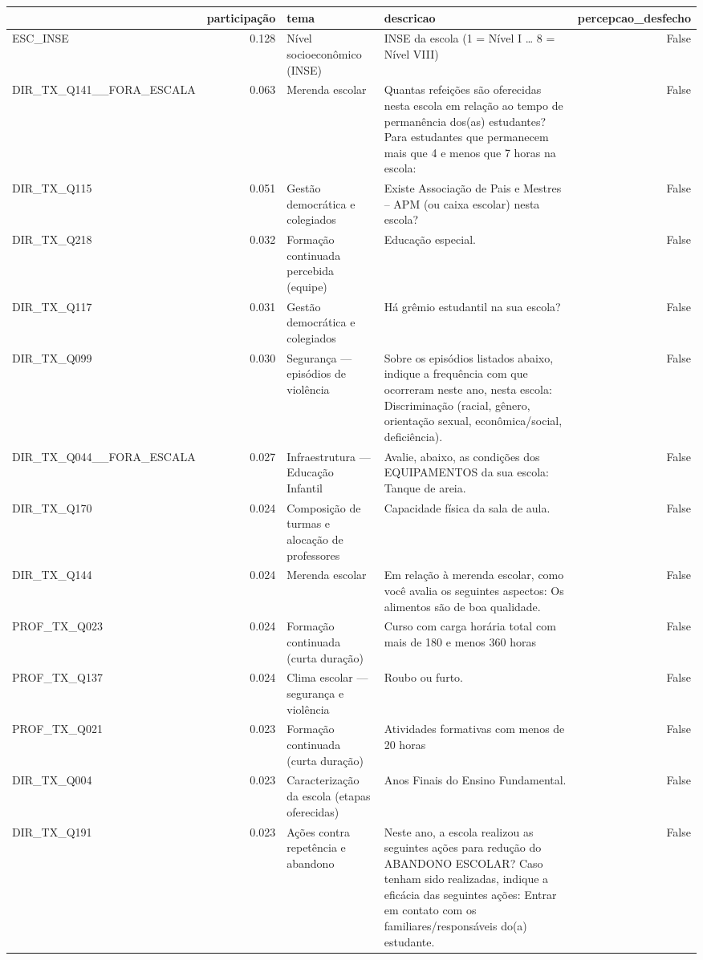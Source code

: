 \begin{tabular}{lrllr}
\toprule
 & participação & tema & descricao & percepcao\_desfecho \\
\midrule
ESC\_INSE & 0.128 & Nível socioeconômico (INSE) & INSE da escola (1 = Nível I … 8 = Nível VIII) & False \\
DIR\_TX\_Q141\_\_FORA\_ESCALA & 0.063 & Merenda escolar & Quantas refeições são oferecidas nesta escola em relação ao tempo de permanência dos(as) estudantes? Para estudantes que permanecem mais que 4 e menos que 7 horas na escola: & False \\
DIR\_TX\_Q115 & 0.051 & Gestão democrática e colegiados & Existe Associação de Pais e Mestres – APM (ou caixa escolar) nesta escola? & False \\
DIR\_TX\_Q218 & 0.032 & Formação continuada percebida (equipe) & Educação especial. & False \\
DIR\_TX\_Q117 & 0.031 & Gestão democrática e colegiados & Há grêmio estudantil na sua escola? & False \\
DIR\_TX\_Q099 & 0.030 & Segurança — episódios de violência & Sobre os episódios listados abaixo, indique a frequência com que ocorreram neste ano, nesta escola: Discriminação (racial, gênero, orientação sexual, econômica/social, deficiência). & False \\
DIR\_TX\_Q044\_\_FORA\_ESCALA & 0.027 & Infraestrutura — Educação Infantil & Avalie, abaixo, as condições dos EQUIPAMENTOS da sua escola: Tanque de areia. & False \\
DIR\_TX\_Q170 & 0.024 & Composição de turmas e alocação de professores & Capacidade física da sala de aula. & False \\
DIR\_TX\_Q144 & 0.024 & Merenda escolar & Em relação à merenda escolar, como você avalia os seguintes aspectos: Os alimentos são de boa qualidade. & False \\
PROF\_TX\_Q023 & 0.024 & Formação continuada (curta duração) & Curso com carga horária total com mais de 180 e menos 360 horas & False \\
PROF\_TX\_Q137 & 0.024 & Clima escolar — segurança e violência & Roubo ou furto. & False \\
PROF\_TX\_Q021 & 0.023 & Formação continuada (curta duração) & Atividades formativas com menos de 20 horas & False \\
DIR\_TX\_Q004 & 0.023 & Caracterização da escola (etapas oferecidas) & Anos Finais do Ensino Fundamental. & False \\
DIR\_TX\_Q191 & 0.023 & Ações contra repetência e abandono & Neste ano, a escola realizou as seguintes ações para redução do ABANDONO ESCOLAR? Caso tenham sido realizadas, indique a eficácia das seguintes ações: Entrar em contato com os familiares/responsáveis do(a) estudante. & False \\

\end{tabular}
